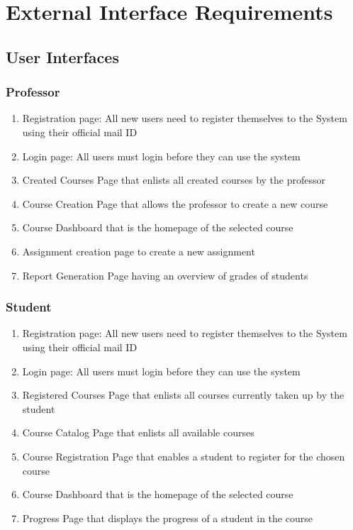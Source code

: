 \documentclass[12pt, a4]{report}
\begin{document}
\chapter{External Interface Requirements}
\section{User Interfaces}

\subsection{Professor}
\begin{enumerate}
    \item Registration page: All new users need to register themselves to the System using their official mail ID
    \item Login page: All users must login before they can use the system
    \item Created Courses Page that enlists all created courses by the professor
    \item Course Creation Page that allows the professor to create a new course
    \item Course Dashboard that is the homepage of the selected course
    \item Assignment creation page to create a new assignment
    \item Report Generation Page having an overview of grades of students
\end{enumerate}

\subsection{Student}
\begin{enumerate}
    \item Registration page: All new users need to register themselves to the System using their official mail ID
    \item Login page: All users must login before they can use the system
    \item Registered Courses Page that enlists all courses currently taken up by the student
    \item Course Catalog Page that enlists all available courses
    \item Course Registration Page that enables a student to register for the chosen course
    \item Course Dashboard that is the homepage of the selected course
    \item Progress Page that displays the progress of a student in the course
\end{enumerate}
\end{document}

